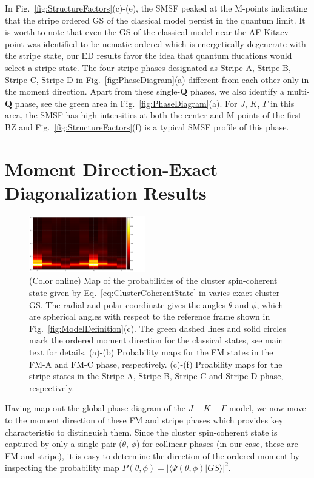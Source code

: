 \documentclass[aps,prb,reprint,amsfonts,amsmath,amssymb,showpacs,groupedaddress,superscriptaddress]{revtex4-1}
\begin{document}
In Fig.~\ref{fig:StructureFactors}(c)-(e), the SMSF peaked at the M-points indicating that the stripe ordered GS of the classical model persist in the quantum limit. It is worth to note that even the GS of the classical model near the AF Kitaev point was identified to be nematic ordered which is energetically degenerate with the stripe state, our ED results favor the idea that quantum flucations would select a stripe state. The four stripe phases designated as Stripe-A, Stripe-B, Stripe-C, Stripe-D in Fig.~\ref{fig:PhaseDiagram}(a) different from each other only in the moment direction. Apart from these single-$\mathbf{Q}$ phases, we also identify a multi-$\mathbf{Q}$ phase, see the green area in Fig.~\ref{fig:PhaseDiagram}(a). For $J$, $K$, $\Gamma$ in this area, the SMSF has high intensities at both the center and M-points of the first BZ and Fig.~\ref{fig:StructureFactors}(f) is a typical SMSF profile of this phase.

\section{\label{sec:SectionV}Moment Direction-Exact Diagonalization Results}
\begin{figure}
    \includegraphics[width=0.45\textwidth]{Fig5.pdf}
    \caption{\label{fig:Proabilities}(Color online) Map of the probabilities of the cluster spin-coherent state given by Eq.~\eqref{eq:ClusterCoherentState} in varies exact cluster GS. The radial and polar coordinate gives the angles $\theta$ and $\phi$, which are spherical angles with respect to the reference frame shown in Fig.~\ref{fig:ModelDefinition}(c). The green dashed lines and solid circles mark the ordered moment direction for the classical states, see main text for details. (a)-(b) Probability maps for the FM states in the FM-A and FM-C phase, respectively. (c)-(f) Proability maps for the stripe states in the Stripe-A, Stripe-B, Stripe-C and Stripe-D phase, respectively.}
\end{figure}

Having map out the global phase diagram of the $J-K-\Gamma$ model, we now move to the moment direction of these FM and stripe phases which provides key characteristic to distinguish them. Since the cluster spin-coherent state is captured by only a single pair ($\theta$, $\phi$) for collinear phases (in our case, these are FM and stripe), it is easy to determine the direction of the ordered moment by inspecting the probability map $P(\theta, \phi) = | \langle \Psi (\theta, \phi) | GS \rangle |^2$.
\end{document}
